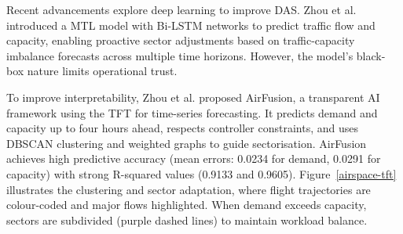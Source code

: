 Recent advancements explore deep learning to improve \gls{DAS}. 
Zhou et al. \cite{Zhou_2022} introduced a \gls{MTL} model with \gls{Bi-LSTM} networks to predict traffic flow and capacity, enabling proactive sector adjustments based on traffic-capacity imbalance forecasts across multiple time horizons. 
However, the model's black-box nature limits operational trust.


To improve interpretability, Zhou et al. \cite{Zhou_2023} proposed AirFusion, a transparent \gls{AI} framework using the \gls{TFT} for time-series forecasting. 
It predicts demand and capacity up to four hours ahead, respects controller constraints, and uses \gls{DBSCAN} clustering and weighted graphs to guide sectorisation. 
AirFusion achieves high predictive accuracy (mean errors: 0.0234 for demand, 0.0291 for capacity) with strong R-squared values (0.9133 and 0.9605).
Figure~\ref{airspace-tft} illustrates the clustering and sector adaptation, where flight trajectories are colour-coded and major flows highlighted. 
When demand exceeds capacity, sectors are subdivided (purple dashed lines) to maintain workload balance.


